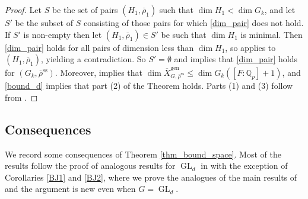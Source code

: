 \documentclass{amsart}
\theoremstyle{definition}
\theoremstyle{remark}
\DeclareMathOperator{\GL}{GL}
\newcommand{\Qp}{\mathbb {Q}_p}
\newcommand{\rhobar}{\overline{\rho}}
\newcommand{\gen}{\mathrm{gen}}
\newcommand{\Xbar}{\overline{X}}
\newcommand{\rhobarss}{\rhobar^{\mathrm{ss}}}
\begin{document}
\begin{proof}
Let $S$ be the set of pairs $(H_1, \rhobar_1)$ such that $\dim H_1 < \dim G_k$, and let $S'$ be the subset of $S$ consisting of those pairs for which \eqref{dim_pair} does not hold.
  If $S'$ is non-empty then let $(H_1, \rhobar_1) \in S'$ be such that $\dim H_1$ is minimal.
  Then \eqref{dim_pair} holds for all pairs of dimension less than $\dim H_1$, so  applies to $(H_1, \rhobar_1)$, yielding a contradiction.
  So $S' = \emptyset$ and   implies that \eqref{dim_pair}
  holds for $(G_k, \rhobarss)$. Moreover,  implies that 
  $\dim \Xbar^{\gen}_{G, \rhobarss} \le \dim G_k ([F:\Qp]+1)$, and \eqref{bound_d}
  implies that part (2) of the Theorem holds. Parts (1) and (3) follow from 
  .
\end{proof}

\subsection{Consequences}\label{sec_consequence}

We record some consequences of Theorem \ref{thm_bound_space}. Most of the results follow 
the proof of analogous results for $\GL_d$ in \cite{BIP_new} with the exception of Corollaries 
\ref{BJ1} and \ref{BJ2}, where we prove the analogues of the main results of \cite{BJ_new}
and the argument is new even when $G=\GL_d$.
\end{document}

